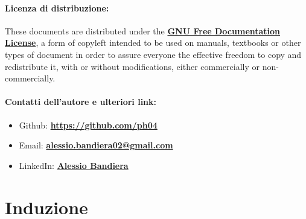 \documentclass[a4paper, 12pt]{report}
\begin{document}
    \quad

    \subsubsection{Licenza di distribuzione:}
    
    These documents are distributed under the \textbf{\href{https://www.gnu.org/licenses/fdl-1.3.txt}{GNU Free Documentation License}}, a form of copyleft intended to be used on manuals, textbooks or other types of document in order to assure everyone the effective freedom to copy and redistribute it, with or without modifications, either commercially or non-commercially.
    
    \quad

    \subsubsection{Contatti dell'autore e ulteriori link:}
    \begin{itemize}


        \item Github: \textbf{\href{https://github.com/ph04}{https://github.com/ph04}}
        \item Email: \textbf{\href{mailto:alessio.bandiera02@gmail.com}{alessio.bandiera02@gmail.com}}
        \item LinkedIn: \textbf{\href{https://www.linkedin.com/in/alessio-bandiera-a53767223/}{Alessio Bandiera}}
    \end{itemize}


    \chapter{Induzione}
    
\end{document}
